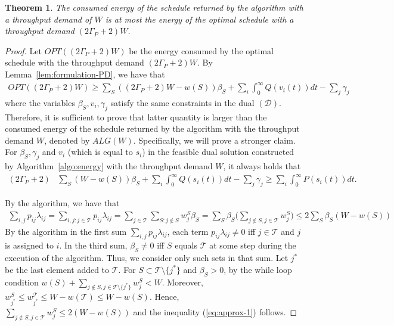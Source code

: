 \documentclass[11pt,a4paper]{article}
\newtheorem{theorem}{Theorem}
\begin{document}
\begin{theorem}		\label{thm:approx-main}
The consumed energy of the schedule returned by the algorithm with a throughput demand of
$W$ is at most the energy of the optimal schedule with a throughput 
demand $(2\Gamma_{P}+2)W$.
\end{theorem}
\begin{proof}
Let $OPT((2\Gamma_{P}+2)W)$ be the energy consumed by the optimal schedule
with the throughput demand $(2\Gamma_{P}+2)W$. By Lemma~\ref{lem:formulation-PD}, 
we have that 
\begin{align*}
OPT((2\Gamma_{P}+2)W) \geq 
 \sum_{S}  ((2\Gamma_{P}+2)W - w(S))\beta_{S} 
+ \sum_{i}\int_{0}^{\infty} Q(v_{i}(t)) dt - \sum_{j} \gamma_{j}
\end{align*}
where the variables $\beta_{S},v_{i},\gamma_{j}$ satisfy the same constraints in the dual
$(\mathcal{D})$. Therefore, it is sufficient to prove that latter quantity is larger than
the consumed energy of the schedule returned by the algorithm with the throughput demand $W$, denoted by $ALG(W)$.
Specifically, we will prove a stronger claim. For $\beta_{S}, \gamma_{j}$ and $v_{i}$ (which is equal to $s_{i}$) in the 
feasible dual solution constructed by Algorithm~\ref{algo:energy} with the throughput demand $W$, it always holds that
\begin{align*}
(2\Gamma_{P}+2) &\sum_{S}(W - w(S))\beta_{S} + \sum_{i}\int_{0}^{\infty} Q(s_{i}(t)) dt - \sum_{j} \gamma_{j} \geq \sum_{i} \int_{0}^{\infty} P(s_{i}(t)) dt.
\end{align*}

By the algorithm, we have that \begin{align}	\label{eq:approx-1}
	\sum_{i,j} p_{ij}\lambda_{ij} = \sum_{i,j: j \in \mathcal{T}} p_{ij}\lambda_{ij}
		= \sum_{j \in \mathcal{T}} \sum_{S: j\notin S} w^{S}_{j}\beta_{S} 
		= \sum_{S} \beta_{S} \biggl( \sum_{j \notin S, j \in \mathcal{T}} w^{S}_{j}\biggl)
		\leq 2 \sum_{S} \beta_{S} (W - w(S))
\end{align}
By the algorithm in the first sum $\sum_{i,j} p_{ij}\lambda_{ij}$, each term $p_{ij}\lambda_{ij} \neq 0$ iff
$j \in \mathcal{T}$ and $j$ is assigned to $i$. In the third sum, $\beta_{S} \neq 0$ iff $S$ equals
$\mathcal{T}$ at some step during the execution of the algorithm. Thus, we consider only such sets 
in that sum. Let $j^{*}$ be the last element 
added to $\mathcal{T}$. For $S \subset \mathcal{T} \setminus \{j^{*}\}$
and $\beta_{S} > 0$, by the while loop condition 
$w(S) + \sum_{j \notin S, j \in \mathcal{T} \setminus \{j^{*}\}} w^{S}_{j} < W$. Moreover,
$w^{S}_{j^{*}} \leq w^{\mathcal{T}}_{j^{*}} \leq W - w(\mathcal{T}) \leq W - w(S)$.
Hence, $\sum_{j \notin S, j \in \mathcal{T}}w^{S}_{j} \leq 2 (W - w(S))$ and the inequality 
(\ref{eq:approx-1}) follows.


\end{proof}
\end{document}

